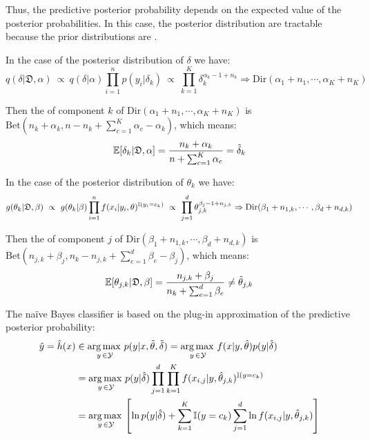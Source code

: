 Thus, the predictive posterior probability depends on the expected value of the posterior probabilities. In this case, the posterior distribution are tractable because the prior distributions are .

In the case of the posterior distribution of $\delta$ we have:
\begin{equation*}
    q(\delta|\mathfrak{D},\alpha)\ \propto\ q(\delta|\alpha)\prod_{i=1}^n p(y_i|\delta_k)\ \propto\ \prod_{k=1}^K\delta_k^{\alpha_k-1+n_k}\Rightarrow \text{Dir}(\alpha_1+n_1,\cdots,\alpha_K+n_K)
\end{equation*}

Then the  of component $k$ of $\text{Dir}(\alpha_1+n_1,\cdots,\alpha_K+n_K)$ is $\text{Bet}(n_k+\alpha_k, n-n_k+\sum_{c=1}^K\alpha_c-\alpha_k)$, which means:
\begin{equation*}
    \operatorname{\mathbb{E}} [\delta_k|\mathfrak{D},\alpha] = \frac{n_k+\alpha_k}{n+\sum_{c=1}^K\alpha_c} = \Tilde{\delta}_k
\end{equation*}

In the case of the posterior distribution of $\theta_k$ we have:
\begin{equation*}
    g(\theta_k|\mathfrak{D},\beta)\  \propto\  g(\theta_k|\beta)\prod_{i=1}^n f(x_i|y_i,\theta)^{\operatorname{\mathbb{I}}(y_i=c_k)}\ \propto\ \prod_{j=1}^d \theta_{j,k}^{\beta_j-1+n_{j,k}}\Rightarrow \text{Dir}(\beta_1+n_{1,k},\cdots,\beta_d+n_{d,k})
\end{equation*}

Then the  of component $j$ of $\text{Dir}(\beta_1+n_{1,k},\cdots,\beta_d+n_{d,k})$ is $\text{Bet}(n_{j,k}+\beta_j, n_k-n_{j,k}+\sum_{e=1}^d\beta_e-\beta_j)$, which means:
\begin{equation*}
    \operatorname{\mathbb{E}} [\theta_{j,k}|\mathfrak{D},\beta] = \frac{n_{j,k}+\beta_j}{n_k+\sum_{e=1}^d\beta_e} \neq \Tilde{\theta}_{j,k}
\end{equation*}

\newpage













The naïve Bayes classifier is based on the plug-in approximation of the predictive posterior probability:
\begin{align*}
    \hat{y}=\hat{h}(x) &\in   \operatorname*{arg\,max\,}_{y\,\in\mathcal{Y}}p(y|x,\Tilde{\theta},\Tilde{\delta})  = \operatorname*{arg\,max\,}_{y\,\in\mathcal{Y}} f(x|y,\hat{\theta})p(y|\hat{\delta})\\
    &= \operatorname*{arg\,max\,}_{y\,\in\mathcal{Y}}p(y|\hat{\delta})\prod_{j=1}^d\prod_{k=1}^K  f(x_{i,j}|y,\hat{\theta}_{j,k})^{\operatorname{\mathbb{I}}(y=c_k)}\\
    &= \operatorname*{arg\,max\,}_{y\,\in\mathcal{Y}}\left[ \ln p(y|\hat{\delta})+\sum_{k=1}^K\operatorname{\mathbb{I}}(y=c_k)\sum_{j=1}^d  \ln f(x_{i,j}|y,\hat{\theta}_{j,k})\right]
\end{align*}




